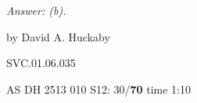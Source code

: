 	
\emph{Answer: (b).}
  
  by David A. Huckaby

SVC.01.06.035






AS DH 2513 010 S12: 30/{\bf70} time 1:10  \\
